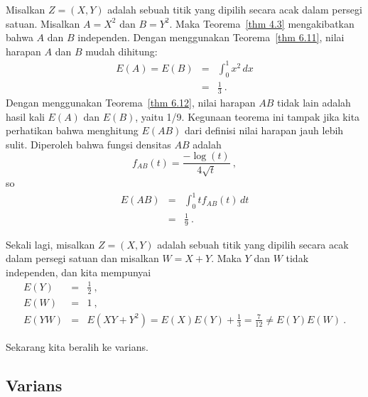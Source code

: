{\begin{example}\label{exam 6.19} Misalkan $Z = (X, Y)$ adalah sebuah titik yang
dipilih secara acak dalam persegi satuan. Misalkan $A = X^2$ dan $B = Y^2$. Maka
Teorema~\ref{thm 4.3} mengakibatkan bahwa $A$ dan $B$ independen. Dengan menggunakan
Teorema~\ref{thm 6.11}, nilai harapan $A$ dan $B$ mudah dihitung:
\begin{eqnarray*} E(A) = E(B) & = & \int_0^1 x^2\,dx \\ & = & \frac 13\ .
\end{eqnarray*} Dengan menggunakan Teorema~\ref{thm 6.12}, nilai harapan $AB$ tidak
lain adalah hasil kali $E(A)$ dan $E(B)$, yaitu 1/9. Kegunaan teorema ini tampak jika
kita perhatikan bahwa menghitung $E(AB)$ dari definisi nilai harapan jauh lebih sulit.
Diperoleh bahwa fungsi densitas $AB$ adalah
$$f_{AB}(t) = \frac {-\log(t)}{4\sqrt t}\ ,$$ so
\begin{eqnarray*} E(AB) & = & \int_0^1 t f_{AB}(t)\,dt \\ & = & \frac 19\ .
\end{eqnarray*}
\end{example}

\begin{example}\label{exam 6.20} Sekali lagi, misalkan $Z = (X, Y)$ adalah sebuah
titik yang dipilih secara acak dalam persegi satuan dan misalkan $W = X + Y$. Maka
$Y$ dan $W$ tidak independen, dan kita mempunyai
\begin{eqnarray*} E(Y) & = &\frac 12\ , \\ E(W) & = & 1\ , \\ E(YW) & = & E(XY + Y^2)
= E(X)E(Y) + \frac 13 = \frac 7{12}
\ne E(Y)E(W)\ .
\end{eqnarray*}
\end{example}

Sekarang kita beralih ke varians.


\subsection*{Varians}

}
